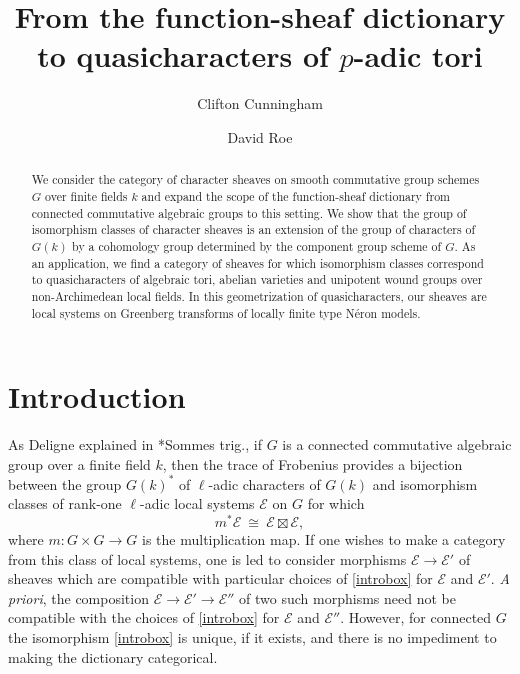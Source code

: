\documentclass[10pt]{amsart}
\title{From the function-sheaf dictionary to quasicharacters of $p$-adic tori}
\author{Clifton Cunningham}
\author{David Roe}
\theoremstyle{plain}
\theoremstyle{definition}
\theoremstyle{remark}
\newcommand{\Fq}{k}
\newcommand{\iso}{{\ \cong\ }}
\newcommand{\cs}[1]{{\mathcal{#1}}}
\begin{document}
\begin{abstract}
We consider the category of character sheaves on smooth commutative group schemes $G$ over finite fields $k$ and expand the scope of the function-sheaf dictionary from connected commutative algebraic groups to this setting.
We show that the group of isomorphism classes of character sheaves is an extension of the group of characters of $G(k)$ by a cohomology group determined by the component group scheme of $G$.
As an application, we find a category of sheaves for which isomorphism classes correspond to quasi\-characters of algebraic tori, abelian varieties and unipotent wound groups over non-Archimedean local fields. 
In this geometrization of quasicharacters, our sheaves are local systems on
Greenberg transforms of locally finite type N\'eron models.
\end{abstract}

\maketitle

\tableofcontents

\section*{Introduction}


As Deligne explained in \cite{deligne:SGA4.5}*{Sommes trig.}, if $G$ is a connected commutative algebraic group over a finite field $k$, then the trace of Frobenius provides a bijection between the group $G(\Fq)^*$ of $\ell$-adic characters of $G(\Fq)$ and isomorphism classes of rank-one $\ell$-adic local systems $\mathcal{E}$ on $G$ for which 
\begin{equation}\label{introbox}
m^* \cs{E} \iso \cs{E} \boxtimes \cs{E},
\end{equation}
where $m : G\times G\to G$ is the multiplication map.
%
If one wishes to make a category from this class of local systems, one is led to consider morphisms $\cs{E} \to \cs{E}'$ of sheaves which are compatible with particular choices of \eqref{introbox} for $\cs{E}$ and $\cs{E'}$. 
{\it A priori}, the composition $\cs{E} \to \cs{E}' \to \cs{E}''$ of two such morphisms need not be compatible with the choices of \eqref{introbox} for $\cs{E}$ and $\cs{E}''$.
 However, for connected $G$ the isomorphism \eqref{introbox} is unique, if it exists, and there is no impediment to making the dictionary categorical.
\end{document}
